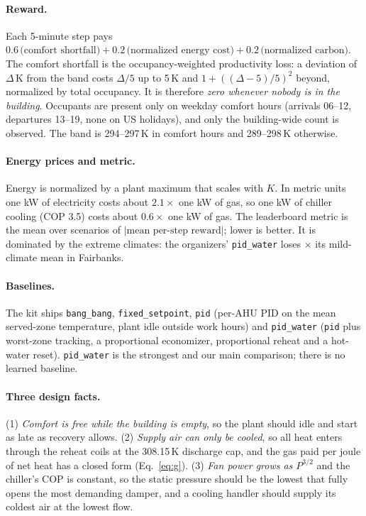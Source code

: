 \documentclass{article}
\begin{document}
\paragraph{Reward.} Each 5-minute step pays $0.6\,\text{(comfort shortfall)} + 0.2\,\text{(normalized energy cost)} + 0.2\,\text{(normalized carbon)}$. The comfort shortfall is the occupancy-weighted productivity loss: a deviation of $\Delta$\,K from the band costs $\Delta/5$ up to 5\,K and $1+((\Delta-5)/5)^2$ beyond, normalized by total occupancy. It is therefore \emph{zero whenever nobody is in the building}. Occupants are present only on weekday comfort hours (arrivals 06--12, departures 13--19, none on US holidays), and only the building-wide count is observed. The band is 294--297\,K in comfort hours and 289--298\,K otherwise.

\paragraph{Energy prices and metric.} Energy is normalized by a plant maximum that scales with $K$. In metric units one kW of electricity costs about $2.1\times$ one kW of gas, so one kW of chiller cooling (COP 3.5) costs about $0.6\times$ one kW of gas. The leaderboard metric is the mean over scenarios of $|\text{mean per-step reward}|$; lower is better. It is dominated by the extreme climates: the organizers' \texttt{pid\_water} loses \ExtremeRatioFairbanks$\times$ its mild-climate mean in Fairbanks.

\paragraph{Baselines.} The kit ships \texttt{bang\_bang}, \texttt{fixed\_setpoint}, \texttt{pid} (per-AHU PID on the mean served-zone temperature, plant idle outside work hours) and \texttt{pid\_water} (\texttt{pid} plus worst-zone tracking, a proportional economizer, proportional reheat and a hot-water reset). \texttt{pid\_water} is the strongest and our main comparison; there is no learned baseline.

\paragraph{Three design facts.} (1) \emph{Comfort is free while the building is empty}, so the plant should idle and start as late as recovery allows. (2) \emph{Supply air can only be cooled}, so all heat enters through the reheat coils at the 308.15\,K discharge cap, and the gas paid per joule of net heat has a closed form (Eq.~\ref{eq:g}). (3) \emph{Fan power grows as $P^{3/2}$} and the chiller's COP is constant, so the static pressure should be the lowest that fully opens the most demanding damper, and a cooling handler should supply its coldest air at the lowest flow.
\end{document}
